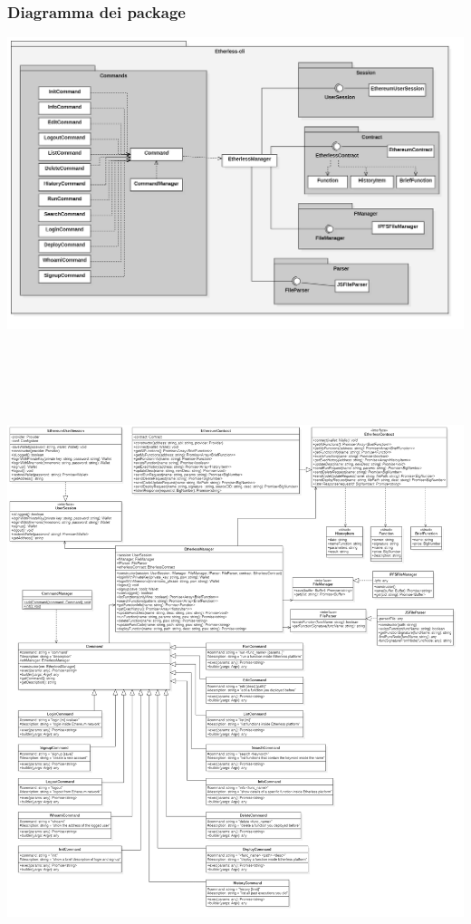 \subsubsection{Diagramma dei package}

\begin{landscape}
	\centerline{\includegraphics[scale=0.33]{diagrammi/etherless-cli/package.png}}
\end{landscape}

\centerline{\includegraphics[height=19cm, width=16cm]{diagrammi/etherless-cli/classi.png}}

